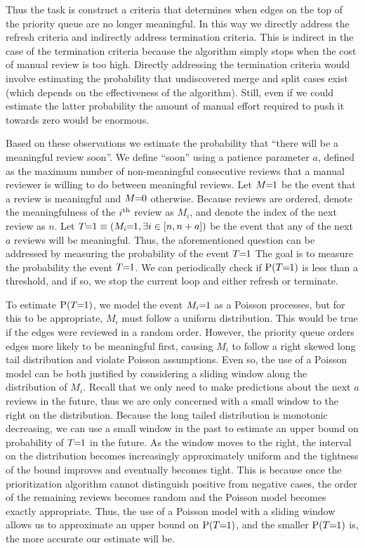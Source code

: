 Thus the task is construct a criteria that determines when edges on the top of the priority queue are no longer
  meaningful.
In this way we directly address the refresh criteria and indirectly address termination criteria.
This is indirect in the case of the termination criteria because the algorithm simply stops when the cost of
  manual review is too high.
Directly addressing the termination criteria would involve estimating the probability that undiscovered merge and
  split cases exist (which depends on the effectiveness of the algorithm).
Still, even if we could estimate the latter probability the amount of manual effort required to push it towards
  zero would be enormous.



Based on these observations we estimate the probability that ``there will be a meaningful review soon''. We define
``soon'' using a patience parameter $a$, defined as the maximum number of non-meaningful consecutive reviews that a
manual reviewer is willing to do between meaningful reviews. Let $M\mkern-6mu=\mkern-6mu1$ be the event that a review is meaningful
and $M\mkern-6mu=\mkern-6mu0$ otherwise. Because reviews are ordered, denote the meaningfulness of the $i^{\textrm{th}}$ review as $M_i$, and
denote the index of the next review as $n$. Let $T\mkern-6mu=\mkern-6mu1 \equiv (M_i\mkern-6mu=\mkern-6mu1, \exists i \in [n, n + a])$ be the event
that any of the next $a$ reviews will be meaningful. Thus, the aforementioned question can be addressed by
measuring the probability of the event $T\mkern-6mu=\mkern-6mu1$ The goal is to measure the probability the event $T\mkern-6mu=\mkern-6mu1$. We can
periodically check if $\mathbin{\operatorname{P}}(T\mkern-6mu=\mkern-6mu1)$ is less than a threshold, and if so, we stop the current loop and either
refresh or terminate.

To estimate $\mathbin{\operatorname{P}}(T\mkern-6mu=\mkern-6mu1)$, we model the event $M_i\mkern-6mu=\mkern-6mu1$ as a Poisson processes, but for this to be appropriate,
$M_i$ must follow a uniform distribution. This would be true if the edges were reviewed in a random order. However,
the priority queue orders edges more likely to be meaningful first, causing $M_i$ to follow a right skewed long
tail distribution and violate Poisson assumptions. Even so, the use of a Poisson model can be both justified by
considering a sliding window along the distribution of $M_i$. Recall that we only need to make predictions about
the next $a$ reviews in the future, thus we are only concerned with a small window to the right on the
distribution. Because the long tailed distribution is monotonic decreasing, we can use a small window in the past
to estimate an upper bound on probability of $T\mkern-6mu=\mkern-6mu1$ in the future. As the window moves to the right, the interval
on the distribution becomes increasingly approximately uniform and the tightness of the bound improves and
eventually becomes tight. This is because once the prioritization algorithm cannot distinguish positive from
negative cases, the order of the remaining reviews becomes random and the Poisson model becomes exactly
appropriate. Thus, the use of a Poisson model with a sliding window allows us to approximate an upper bound on
$\mathbin{\operatorname{P}}(T\mkern-6mu=\mkern-6mu1)$, and the smaller $\mathbin{\operatorname{P}}(T\mkern-6mu=\mkern-6mu1)$ is, the more accurate our estimate will be.


